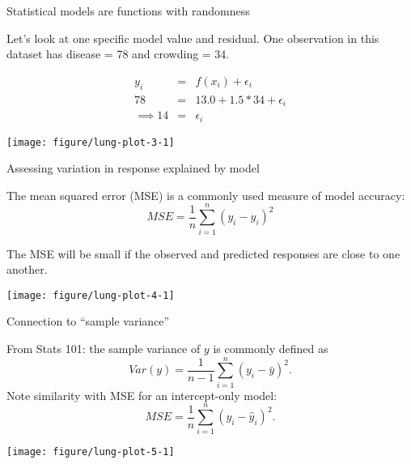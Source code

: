 \documentclass[table]{beamer}\usepackage[]{graphicx}\usepackage[]{color}
\makeatletter
\def\maxwidth{ %
  \ifdim\Gin@nat@width>\linewidth
    \linewidth
  \else
    \Gin@nat@width
  \fi
}
\newenvironment{knitrout}{}{} %
\makeatother
\begin{document}

\begin{frame}[fragile]{Statistical models are functions with randomness}


Let's look at one specific model value and residual. One observation in this dataset has disease = 78 and crowding = 34.

\begin{eqnarray*}
y_i & = & f(x_i) + \epsilon_i  \\
78  & = & 13.0 + 1.5*34 + \epsilon_i\\
\implies 14 & = &  \epsilon_i
\end{eqnarray*}

\begin{knitrout}\footnotesize
{}\color{fgcolor}
\texttt{[image: figure/lung-plot-3-1]} 

\end{knitrout}

\end{frame}




\begin{frame}{Assessing variation in response explained by model}

\bi
\myitem The {\color{orange} mean squared error (MSE)} is a commonly used measure of model accuracy:
$$MSE = \frac{1}{n} \sum_{i=1}^n \left(y_i -\hat y_i\right)^2$$

\myitem The MSE will be small if the observed and predicted responses are close to one another.
\ei

\begin{knitrout}\footnotesize
{}\color{fgcolor}
\texttt{[image: figure/lung-plot-4-1]} 

\end{knitrout}


\end{frame}


\begin{frame}{Connection to ``sample variance''}

From Stats 101: the sample variance of $y$ is commonly defined as 
$$Var(y) = \frac{1}{n-1} \sum_{i=1}^n \left(y_i -\bar y\right)^2.$$
Note similarity with MSE for an intercept-only model:
$$MSE = \frac{1}{n} \sum_{i=1}^n \left(y_i -\hat y_i\right)^2.$$


\begin{knitrout}\footnotesize
{}\color{fgcolor}
\texttt{[image: figure/lung-plot-5-1]} 

\end{knitrout}

\end{frame}
\end{document}
